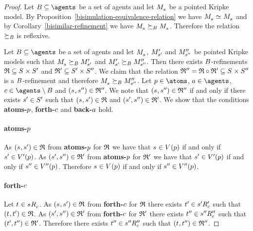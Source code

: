 \begin{proof}
    Let $\agentsB \subseteq \agents$ be a set of agents and let $\kPModel{\kStateS}$ be a pointed Kripke model.
    By Proposition~\ref{bisimulation-equivalence-relation} we have $\kPModel{\kStateS} \bisimilar \kPModel{\kStateS}$ and by Corollary~\ref{bisimilar-refinement} we have $\kPModel{\kStateS} \simulatesBs \kPModel{\kStateS}$.
    Therefore the relation $\succeq_{B}$ is reflexive.

    Let $\agentsB \subseteq \agents$ be a set of agents and let $\kPModel{\kStateS}$, ${M^{\prime}_{{s}^{\prime}}}$ and ${M^{\prime\prime}_{{s}^{\prime\prime}}}$ be pointed Kripke models such that $\kPModel{\kStateS} \simulatesBs \kPModelP{\kStateSP}$ and ${M^{\prime}_{{s}^{\prime}}} \succeq_{B} {M^{\prime\prime}_{{s}^{\prime\prime}}}$.
    Then there exists $B$-refinements $\refinement \subseteq \kStates \times \kStatesP$ and $\mathfrak{R}' \subseteq {S^{\prime}} \times {S^{\prime\prime}}$.
    We claim that the relation $\refinement'' = \refinement \circ \refinement' \subseteq \kStates \times \kStatesPP$ is a $B$-refinement and therefore $\kPModel{\kStateS} \simulatesBs \kPModelPP{\kStateSPP}$.
    Let $\atomP \in \atoms$, $\agentA \in \agents$, $\agentC \in \agents \setminus \agentsB$ and $(\kStateS, \kStateSPP) \in \refinement''$.
    We note that $(\kStateS, \kStateSPP) \in \refinement''$ if and only if there exists ${s}^{\prime} \in {S^{\prime}}$ such that $(\kStateS, \kStateSP) \in \refinement$ and $({s}^{\prime}, {s}^{\prime\prime}) \in \mathfrak{R}'$.
    We show that the conditions {\bf atoms-$p$}, {\bf forth-$c$} and {\bf back-$a$} hold.

    \paragraph{atoms-$p$}
    As $(\kStateS, \kStateSP) \in \refinement$ from {\bf atoms-$p$} for $\mathfrak{R}$ we have that $\kStateS \in \kValuation(\atomP)$ if and only if ${s}^{\prime} \in {V^{\prime}}(p)$.
    As $({s}^{\prime}, {s}^{\prime\prime}) \in \mathfrak{R}'$ from {\bf atoms-$p$} for $\mathfrak{R}'$ we have that ${s}^{\prime} \in {V^{\prime}}(p)$ if and only if ${s}^{\prime\prime} \in {V^{\prime\prime}}(p)$.
    Therefore $\kStateS \in \kValuation(\atomP)$ if and only if ${s}^{\prime\prime} \in {V^{\prime\prime}}(p)$.

    \paragraph{forth-$c$}
    Let $\kStateT \in \kSuccessorsC{\kStateS}$.
    As $(\kStateS, \kStateSP) \in \refinement$ from {\bf forth-$c$} for $\mathfrak{R}$ there exists ${t}^{\prime} \in {{s}^{\prime}} {R^{\prime}_{c}}$ such that $(\kStateT, \kStateTP) \in \refinement$.
    As $({s}^{\prime}, {s}^{\prime\prime}) \in \mathfrak{R}'$ from {\bf forth-$c$} for $\mathfrak{R}'$ there exists ${t}^{\prime\prime} \in {{s}^{\prime\prime}} {R^{\prime\prime}_{c}}$ such that $({t}^{\prime}, {t}^{\prime\prime}) \in \mathfrak{R}'$.
    Therefore there exists ${t}^{\prime\prime} \in {{s}^{\prime\prime}} {R^{\prime\prime}_{c}}$ such that $(\kStateT, \kStateTPP) \in \refinement''$.


\end{proof}
